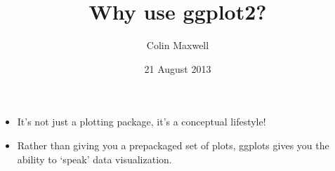 \documentclass[11pt]{article}
\title{Why use ggplot2?}
\author{Colin Maxwell}
\date{21 August 2013}
\begin{document}
\maketitle

\setcounter{tocdepth}{3}
\tableofcontents
\vspace*{1cm}
\begin{itemize}
\item It's not just a plotting package, it's a conceptual lifestyle!
\item Rather than giving you a prepackaged set of plots, ggplots gives you
  the ability to `speak' data visualization.
\end{itemize}
\end{document}
